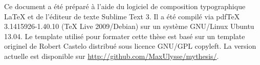 \singlespacing

	\begin{center}
		\begin{tcolorbox}[colback=black!5!white,colframe=white!15!black,arc=0mm]
			\sffamily
			Ce document a été préparé à l'aide du logiciel de composition typographique {\LaTeX} et de l'éditeur de texte Sublime Text 3. Il a été compilé via pdfTeX 3.1415926-1.40.10 (TeX Live 2009/Debian) sur un système GNU/Linux Ubuntu 13.04. Le template utilisé pour formater cette thèse est basé sur un template originel de Robert Castelo distribué sous licence GNU/GPL copyleft. La version actuelle est disponible sur \url{http://github.com/MaxUlysse/mythesis/}.
		\end{tcolorbox}
	\end{center}
